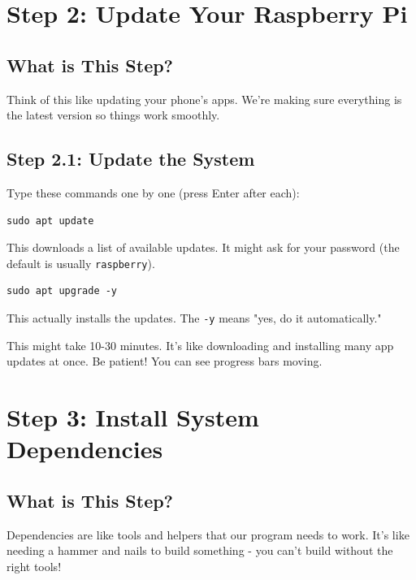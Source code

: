 \documentclass[12pt,a4paper]{article}
\begin{document}
\section{Step 2: Update Your Raspberry Pi}

\subsection{What is This Step?}

Think of this like updating your phone's apps. We're making sure everything is the latest version so things work smoothly.

\subsection{Step 2.1: Update the System}

Type these commands one by one (press Enter after each):

\begin{lstlisting}
sudo apt update
\end{lstlisting}

This downloads a list of available updates. It might ask for your password (the default is usually \texttt{raspberry}).

\begin{lstlisting}
sudo apt upgrade -y
\end{lstlisting}

This actually installs the updates. The \texttt{-y} means "yes, do it automatically."

\begin{tipbox}
This might take 10-30 minutes. It's like downloading and installing many app updates at once. Be patient! You can see progress bars moving.
\end{tipbox}

\section{Step 3: Install System Dependencies}

\subsection{What is This Step?}

Dependencies are like tools and helpers that our program needs to work. It's like needing a hammer and nails to build something - you can't build without the right tools!
\end{document}
